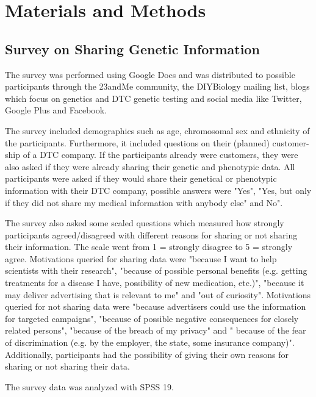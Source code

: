 \documentclass[10pt]{article}
\begin{document}
 
\section*{Materials and Methods}
\subsection*{Survey on Sharing Genetic Information}
The survey was performed using Google Docs and was distributed to possible participants through the 23andMe community, the DIYBiology mailing list, 
blogs which focus on genetics and DTC genetic testing and social media like Twitter, Google Plus and Facebook.  

The survey included demographics such as age, chromosomal sex and ethnicity of the participants. Furthermore, it included questions on their 
(planned) customer-ship of a DTC company. If the participants already were customers, they were also asked if they were already sharing their genetic and phenotypic data. 
All participants were asked if they would share their genetical or phenotypic information with their DTC company, possible answers were "Yes", "Yes, 
but only if they did not share my medical information with anybody else" and No".

The survey also asked some scaled questions which measured how strongly participants agreed/disagreed with different reasons for sharing or not sharing their 
information. The scale went from 1 = strongly disagree to  5 = strongly agree. Motivations queried for sharing data 
were "because I want to help scientists with their research", "because of possible personal benefits (e.g. getting treatments for a disease I have, 
possibility of new medication, etc.)", "because it may deliver advertising that is relevant to me" and "out of curiosity". Motivations queried for not sharing 
data were "because advertisers could use the information for targeted campaigns", "because of possible negative consequences for closely related persons", 
"because of the breach of my privacy" and " because of the fear of discrimination (e.g. by the employer, the state, some insurance company)". 
Additionally, participants had the possibility of giving their own reasons for sharing or not sharing their data.

The survey data was analyzed with SPSS 19. 
\end{document}
